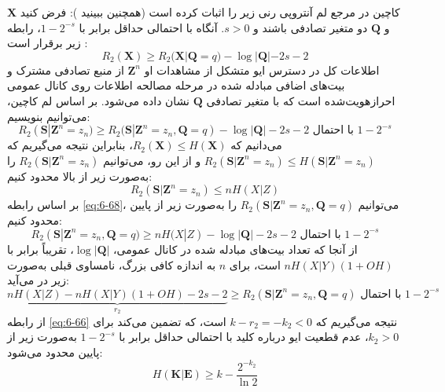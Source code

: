 کاچین در مرجع \cite{117} لم آنتروپی رنی زیر را اثبات کرده است (همچنین ببینید \cite{118}): فرض کنید $\bm{X}$ و $\bm{Q}$ دو متغیر تصادفی باشند و $s > 0$. آنگاه با احتمالی حداقل برابر با $1 - 2^{-s}$، رابطه زیر برقرار است \cite{117, 118}:
\begin{equation}
	R_2(\bm{X}) \geq R_2(\bm{X}|\bm{Q}=q) - \log |\bm{Q}| - 2s - 2
	\label{eq:6-67}
\end{equation}
اطلاعات کل در دسترس ایو متشکل از مشاهدات او $\bm{Z}^n$ از منبع تصادفی مشترک و بیت‌های اضافی مبادله شده در مرحله مصالحه اطلاعات روی کانال عمومی احرازهویت‌شده است که با متغیر تصادفی $\bm{Q}$ نشان داده می‌شود. بر اساس لم کاچین، می‌توانیم بنویسیم:
\begin{equation}
	R_2(\bm{S}|\bm{Z}^n=z_n) \geq R_2(\bm{S}|\bm{Z}^n=z_n, \bm{Q}=q) - \log |\bm{Q}| - 2s - 2 \text{ با احتمال } 1 - 2^{-s}
	\label{eq:6-68}
\end{equation}
می‌دانیم که $R_2(\bm{X}) \leq H(\bm{X})$، بنابراین نتیجه می‌گیریم که $R_2(\bm{S}|\bm{Z}^n=z_n) \leq H(\bm{S}|\bm{Z}^n=z_n)$ و از این رو، می‌توانیم $R_2(\bm{S}|\bm{Z}^n=z_n)$ را به‌صورت زیر از بالا محدود کنیم:
\begin{equation}
	R_2(\bm{S}|\bm{Z}^n=z_n) \leq nH(X|Z)
	\label{eq:6-69}
\end{equation}
بر اساس رابطه \eqref{eq:6-68}، می‌توانیم $R_2(\bm{S}|\bm{Z}^n=z_n, \bm{Q}=q)$ را به‌صورت زیر از پایین محدود کنیم:
\begin{equation}
	R_2(\bm{S}|\bm{Z}^n=z_n, \bm{Q}=q) \geq nH(X|Z) - \log |\bm{Q}| - 2s - 2 \text{ با احتمال } 1 - 2^{-s}
	\label{eq:6-70}
\end{equation}
از آنجا که تعداد بیت‌های مبادله شده در کانال عمومی، $\log |\bm{Q}|$، تقریباً برابر با $nH(X|Y)(1 + OH)$ است، برای $n$ به اندازه کافی بزرگ، نامساوی قبلی به‌صورت زیر در می‌آید:
\begin{equation}
	\underbrace{nH(X|Z) - nH(X|Y)(1 + OH) - 2s - 2}_{r_2} \geq R_2(\bm{S}|\bm{Z}^n=z_n, \bm{Q}=q) \text{ با احتمال } 1 - 2^{-s}
	\label{eq:6-71}
\end{equation}
از رابطه \eqref{eq:6-66} نتیجه می‌گیریم که $k - r_2 = -k_2 < 0$ است، که تضمین می‌کند برای $k_2 > 0$، عدم قطعیت ایو درباره کلید با احتمالی حداقل برابر با $1 - 2^{-s}$ به‌صورت زیر از پایین محدود می‌شود:
\begin{equation}
	H(\bm{K}|\bm{E}) \geq k - \frac{2^{-k_2}}{\ln 2}
	\label{eq:6-72}
\end{equation}


